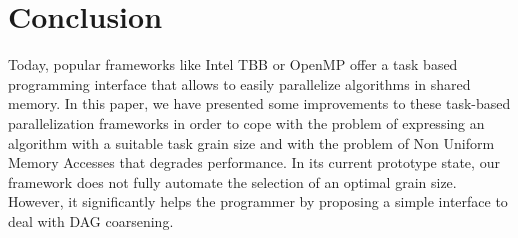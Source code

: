 \section{Conclusion}





Today, popular frameworks like Intel TBB or OpenMP offer a task based programming
interface that allows to easily parallelize algorithms in shared memory.
In this paper, we have presented some improvements to these task-based
parallelization frameworks in order to cope with the problem of expressing an
algorithm with a suitable task grain size and with the problem of Non Uniform Memory
Accesses that degrades performance. In its current prototype state, our framework does not
fully automate the selection of an optimal grain size. However, it
significantly helps the programmer by proposing a simple interface to deal with DAG coarsening.

